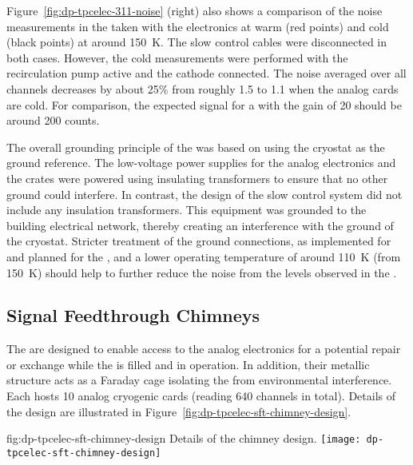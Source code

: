 Figure~\ref{fig:dp-tpcelec-311-noise} (right) also shows a comparison of the noise measurements in the  taken with the  electronics at warm (red points) and cold (black points) at around \SI{150}{\kelvin}. The slow control cables were disconnected in both cases. However, the cold measurements were performed with the recirculation pump active and the cathode  connected. The \rms noise averaged over all channels decreases by about 25\% from roughly \SI{1.5}{} to \SI{1.1}{} when the  analog cards are cold. For comparison, the expected signal for a  with the  gain of \num{20} should be around \SI{200}{} counts. 

The overall grounding principle of the  was based on using the cryostat as the ground reference. The low-voltage power supplies for the  analog electronics and the  crates were powered using insulating transformers to ensure that no other ground could interfere. In contrast, the design of the slow control system did not include any insulation transformers. This equipment was grounded to the building electrical network, thereby creating an interference with the ground of the cryostat. Stricter treatment of the ground connections, as implemented for  and planned for the , and a lower  operating temperature of around \SI{110}{\kelvin} (from \SI{150}{\kelvin}) should help to further reduce the noise from the levels observed in the .


\subsection{Signal Feedthrough Chimneys}
\label{ssec:dp-tpcelec-design-sft}

The  are designed to enable access to the  analog electronics for a potential repair or exchange while the  is filled and in operation. In addition, their metallic structure acts as a Faraday cage isolating the   from environmental interference.  Each  hosts \num{10} analog cryogenic  cards (reading \num{640} channels in total). Details of the design are illustrated in Figure~\ref{fig:dp-tpcelec-sft-chimney-design}. 

\begin{dunefigure}{fig:dp-tpcelec-sft-chimney-design}
{Details of the  chimney design.}
\texttt{[image: dp-tpcelec-sft-chimney-design]}
\end{dunefigure}

